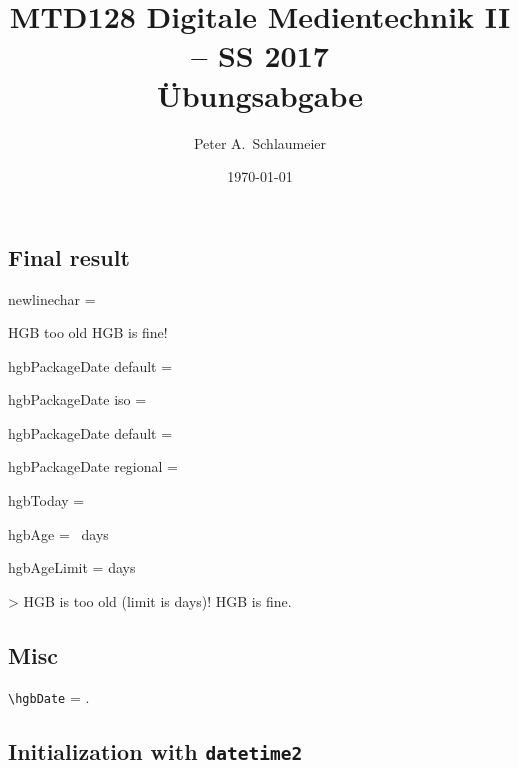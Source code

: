 \documentclass[german,notitlepage,smartquotes,noUpdateCheck]{hgbreport}
\author{Peter A.\ Schlaumeier}
\title{MTD128 Digitale Medientechnik II -- SS 2017\\
				Übungsabgabe \arabic{chapter}}
\date{\today}
\begin{document}
\maketitle

\subsection*{Final result}

newlinechar = {\showthe\newlinechar}

\ifthenelse{\hgbAge>\value{hgbAgeLimit}}%
	{HGB too old}%
	{HGB is fine!}



hgbPackageDate default = 

hgbPackageDate iso = 

hgbPackageDate default = 


\DTMsetregional
hgbPackageDate regional = 


hgbToday = 

hgbAge = \the\hgbAge\ days

hgbAgeLimit =  days

\noindent
\ifnum\hgbAge>\value{hgbAgeLimit}%
     HGB is too old (limit is  days)!%
\else
    HGB is fine.%
\fi




\subsection*{Misc}


\verb!\hgbDate! = \hgbDate.

\subsection*{Initialization with \texttt{datetime2}}


\noindent
{}\\
\\
\\
\\
\end{document}
